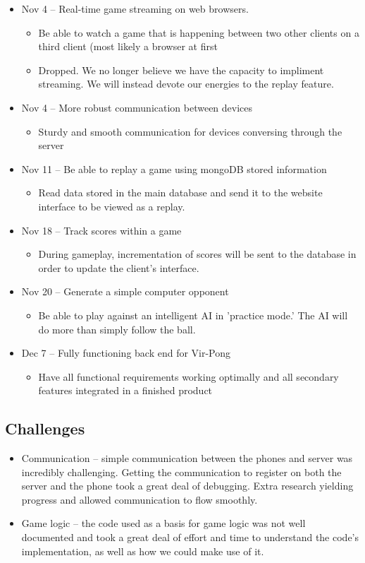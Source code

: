 \documentclass[letterpaper,12pt]{article}
\begin{document}
\begin{itemize}
\begin{itemize}
	\end{itemize}
	\item Nov 4 -- Real-time game streaming on web browsers.
	\begin{itemize}
		\item Be able to watch a game that is happening between two other clients on a third client (most likely a browser at first
		\item Dropped. We no longer believe we have the capacity to impliment streaming. We will instead devote our energies to the replay feature.
	\end{itemize}
	\item Nov 4 -- More robust communication between devices
	\begin{itemize}
		\item Sturdy and smooth communication for devices conversing through the server
	\end{itemize}
	\item Nov 11 -- Be able to replay a game using mongoDB stored information
	\begin{itemize}
		\item Read data stored in the main database and send it to the website interface to be viewed as a replay.
	\end{itemize}
	\item Nov 18 -- Track scores within a game
	\begin{itemize}
		\item During gameplay, incrementation of scores will be sent to the database in order to update the client's interface.
	\end{itemize}
	\item Nov 20 -- Generate a simple computer opponent
	\begin{itemize}
		\item Be able to play against an intelligent AI in 'practice mode.' The AI will do more than simply follow the ball.		
	\end{itemize}
	\item Dec 7 -- Fully functioning back end for Vir-Pong
	\begin{itemize}
		\item Have all functional requirements working optimally and all secondary features integrated in a finished product		
	\end{itemize}
\end{itemize}
\subsection{Challenges}
\begin{itemize}
	\item Communication -- simple communication between the phones and server was incredibly challenging. Getting the communication to register on both the server and the phone took a great deal of debugging. Extra research yielding progress and allowed communication to flow smoothly.
	\item Game logic -- the code used as a basis for game logic was not well documented and took a great deal of effort and time to understand the code's implementation, as well as how we could make use of it.
\end{itemize}
\end{document}
